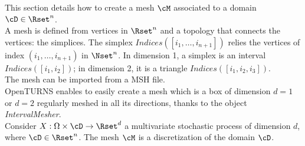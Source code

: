 \renewcommand{\filename}{docUC_StocProc_Mesh.tex}
\renewcommand{\filetitle}{UC : Creation of a mesh}

\HeaderIILevel

\label{UCtimeGrig}




This section details  how to create a mesh $\cM$ associated to a domain $\cD \in \Rset^n$. \\

A mesh is defined from vertices in $\Rset^n$ and a topology that connects the vertices: the simplices. The simplex $Indices([i_1,\dots, i_{n+1}])$ relies the vertices of index $(i_1,\dots, i_{n+1})$ in $\Nset^n$. In dimension 1, a simplex is an interval $Indices([i_1,i_2])$; in dimension 2, it is a triangle $Indices([i_1,i_2, i_3])$. \\

The mesh can be imported from a MSH file.\\

OpenTURNS enables to easily create a mesh which is a box of dimension $d=1$ or $d=2$ regularly meshed in all its directions, thanks to the object {\itshape IntervalMesher}.\\

Consider $X: \Omega \times \cD \rightarrow \Rset^d$ a multivariate stochastic process of dimension $d$, where $\cD \in \Rset^n$. The mesh $\cM$ is a discretization of the domain $\cD$.\\


